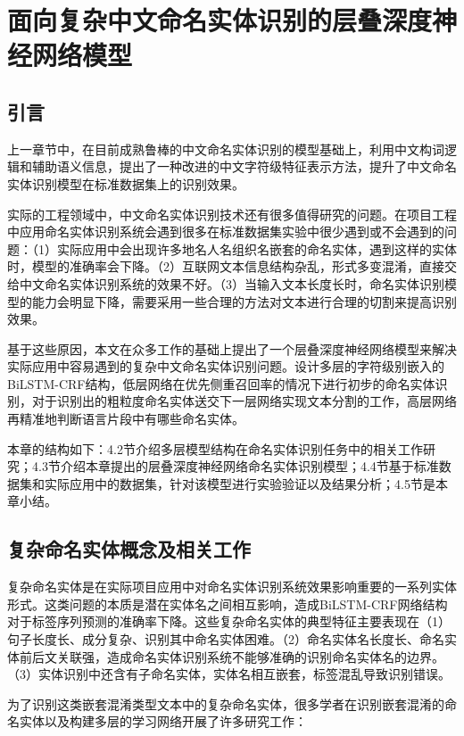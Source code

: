 \documentclass[winfonts,master,oneside,nobackinfo]{njuthesis}
\begin{document}
\chapter{面向复杂中文命名实体识别的层叠深度神经网络模型}

\section{引言}

上一章节中，在目前成熟鲁棒的中文命名实体识别的模型基础上，利用中文构词逻辑和辅助语义信息，提出了一种改进的中文字符级特征表示方法，提升了中文命名实体识别模型在标准数据集上的识别效果。

实际的工程领域中，中文命名实体识别技术还有很多值得研究的问题。在项目工程中应用命名实体识别系统会遇到很多在标准数据集实验中很少遇到或不会遇到的问题：（1）实际应用中会出现许多地名人名组织名嵌套的命名实体，遇到这样的实体时，模型的准确率会下降。（2）互联网文本信息结构杂乱，形式多变混淆，直接交给中文命名实体识别系统的效果不好。（3）当输入文本长度长时，命名实体识别模型的能力会明显下降，需要采用一些合理的方法对文本进行合理的切割来提高识别效果。

基于这些原因，本文在众多工作的基础上提出了一个层叠深度神经网络模型来解决实际应用中容易遇到的复杂中文命名实体识别问题。设计多层的字符级别嵌入的BiLSTM-CRF结构，低层网络在优先侧重召回率的情况下进行初步的命名实体识别，对于识别出的粗粒度命名实体送交下一层网络实现文本分割的工作，高层网络再精准地判断语言片段中有哪些命名实体。

本章的结构如下：4.2节介绍多层模型结构在命名实体识别任务中的相关工作研究；4.3节介绍本章提出的层叠深度神经网络命名实体识别模型；4.4节基于标准数据集和实际应用中的数据集，针对该模型进行实验验证以及结果分析；4.5节是本章小结。





\section{复杂命名实体概念及相关工作}

复杂命名实体是在实际项目应用中对命名实体识别系统效果影响重要的一系列实体形式。这类问题的本质是潜在实体名之间相互影响，造成BiLSTM-CRF网络结构对于标签序列预测的准确率下降。这些复杂命名实体的典型特征主要表现在（1）句子长度长、成分复杂、识别其中命名实体困难。（2）命名实体名长度长、命名实体前后文关联强，造成命名实体识别系统不能够准确的识别命名实体名的边界。（3）实体识别中还含有子命名实体，实体名相互嵌套，标签混乱导致识别错误。

为了识别这类嵌套混淆类型文本中的复杂命名实体，很多学者在识别嵌套混淆的命名实体以及构建多层的学习网络开展了许多研究工作：
\end{document}
